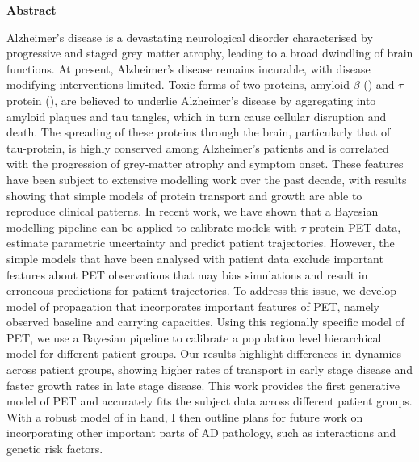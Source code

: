 \begin{center}
    \vspace*{1.5cm}
    \Large \bfseries  Abstract
\end{center}

Alzheimer's disease is a devastating neurological disorder characterised by
progressive and staged grey matter atrophy, leading to a broad dwindling of
brain functions. At present, Alzheimer's disease remains incurable, with disease
modifying interventions limited. Toxic forms of two proteins, amyloid-$\beta$
(\AB) and $\tau$-protein (\TP), are believed to underlie Alzheimer's disease by
aggregating into amyloid plaques and tau tangles, which in turn cause cellular
disruption and death. The spreading of these proteins through the brain,
particularly that of tau-protein, is highly conserved among Alzheimer's patients
and is correlated with the progression of grey-matter atrophy and symptom onset.
These features have been subject to extensive modelling work over the past
decade, with results showing that simple models of protein transport and growth
are able to reproduce clinical patterns. In recent work, we have shown that a
Bayesian modelling pipeline can be applied to calibrate models with
$\tau$-protein PET data, estimate parametric uncertainty and predict patient
trajectories. However, the simple models that have been analysed with patient
data exclude important features about \TP PET observations that may bias
simulations and result in erroneous predictions for patient trajectories. To
address this issue, we develop model of \TP propagation that incorporates
important features of \TP PET, namely observed baseline and carrying capacities.
Using this regionally specific model of \TP PET, we use a Bayesian pipeline to
calibrate a population level hierarchical model for different patient groups.
Our results highlight differences in dynamics across patient groups, showing
higher rates of transport in early stage disease and faster growth rates in late
stage disease. This work provides the first generative model of \TP PET and
accurately fits the subject data across different patient groups. With a robust
model of \TP in hand, I then outline plans for future work on incorporating
other important parts of AD pathology, such as \AB interactions and genetic risk
factors. 